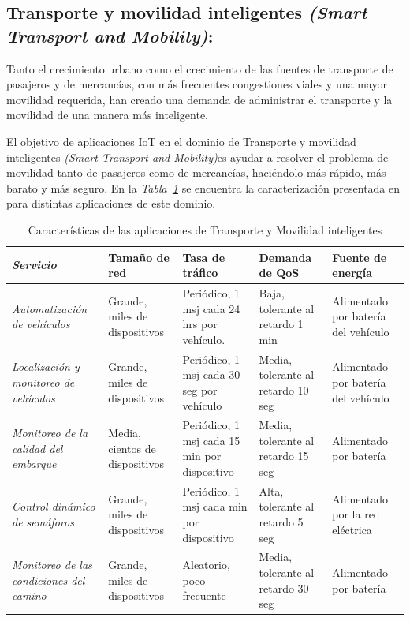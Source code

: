 \subsection{Transporte y movilidad inteligentes \textit{(Smart Transport and Mobility)}:}

Tanto el crecimiento urbano como el crecimiento de las fuentes de transporte de pasajeros y de mercancías, con más frecuentes congestiones viales y una mayor movilidad requerida, han creado una demanda de administrar el transporte y la movilidad de una manera más inteligente. \newline

El objetivo de aplicaciones IoT en el dominio de Transporte y movilidad inteligentes\textit{ (Smart Transport and Mobility)}es ayudar a resolver el problema de movilidad tanto de pasajeros como de mercancías, haciéndolo más rápido, más barato y más seguro. En la \textit{Tabla~\ref{tab:smartrans}} se encuentra la caracterización presentada en \parencite{NetTrafficIoT} para distintas aplicaciones de este dominio.\newline

\begin{table}
\caption{Características de las aplicaciones de Transporte y Movilidad inteligentes}
\label{tab:smartrans}
\centering
\begin{tabular}{*{5}{m{3cm}}}\\ 
\textit{Servicio} & Tamaño de red & Tasa de tráfico & Demanda de QoS & Fuente de energía \\ \hline
\textit{Automatización de vehículos}  & \footnotesize{ Grande, miles de dispositivos } & \footnotesize{ Periódico, 1 msj cada 24 hrs por vehículo. } & \footnotesize{ Baja, tolerante al retardo 1 min } & \footnotesize{ Alimentado por batería del vehículo } \\ \hline 
\textit{Localización y monitoreo de vehículos}  & \footnotesize{ Grande, miles de dispositivos } & \footnotesize{ Periódico, 1 msj cada 30 seg por vehículo } & \footnotesize{ Media, tolerante al retardo 10 seg } & \footnotesize{ Alimentado por batería del vehículo } \\ \hline 
\textit{Monitoreo de la calidad del embarque}  & \footnotesize{ Media, cientos de dispositivos } & \footnotesize{ Periódico, 1 msj cada 15 min por dispositivo } & \footnotesize{ Media, tolerante al retardo 15 seg } & \footnotesize{ Alimentado por batería } \\ \hline 
\textit{Control dinámico de semáforos}  & \footnotesize{ Grande, miles de dispositivos } & \footnotesize{ Periódico, 1 msj cada min por dispositivo } & \footnotesize{ Alta, tolerante al retardo 5 seg } & \footnotesize{ Alimentado por la red eléctrica } \\ \hline 
\textit{Monitoreo de las condiciones del camino} & \footnotesize{ Grande, miles de dispositivos } & \footnotesize{ Aleatorio, poco frecuente } & \footnotesize{ Media, tolerante al retardo 30 seg } & \footnotesize{ Alimentado por batería } \\
\end{tabular}
\end{table}

